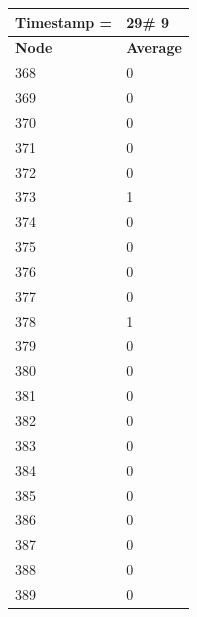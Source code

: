 \begin{tabular}{|l||l|}
\hline
\textbf{Timestamp =} & \textbf{29}\# 9\\\hline
	\textbf{Node} & \textbf{Average} \\ \hline
\hline
	368 & 0 \\ \hline
	369 & 0 \\ \hline
	370 & 0 \\ \hline
	371 & 0 \\ \hline
	372 & 0 \\ \hline
	373 & 1 \\ \hline
	374 & 0 \\ \hline
	375 & 0 \\ \hline
	376 & 0 \\ \hline
	377 & 0 \\ \hline
	378 & 1 \\ \hline
	379 & 0 \\ \hline
	380 & 0 \\ \hline
	381 & 0 \\ \hline
	382 & 0 \\ \hline
	383 & 0 \\ \hline
	384 & 0 \\ \hline
	385 & 0 \\ \hline
	386 & 0 \\ \hline
	387 & 0 \\ \hline
	388 & 0 \\ \hline
	389 & 0 \\ \hline
\end{tabular}

